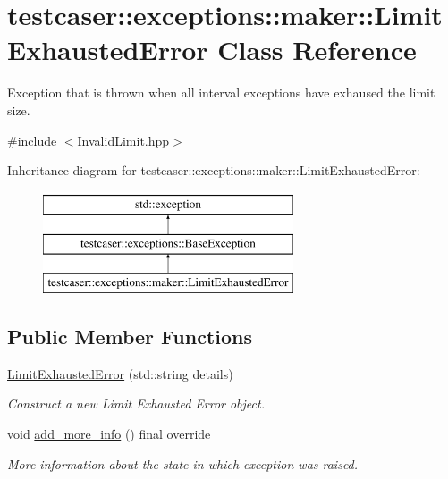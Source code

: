 \hypertarget{classtestcaser_1_1exceptions_1_1maker_1_1LimitExhaustedError}{}\section{testcaser\+:\+:exceptions\+:\+:maker\+:\+:Limit\+Exhausted\+Error Class Reference}
\label{classtestcaser_1_1exceptions_1_1maker_1_1LimitExhaustedError}


Exception that is thrown when all interval exceptions have exhaused the limit size.  




{\ttfamily \#include $<$Invalid\+Limit.\+hpp$>$}

Inheritance diagram for testcaser\+:\+:exceptions\+:\+:maker\+:\+:Limit\+Exhausted\+Error\+:\begin{figure}[H]
\begin{center}
\leavevmode
\includegraphics[height=3.000000cm]{classtestcaser_1_1exceptions_1_1maker_1_1LimitExhaustedError}
\end{center}
\end{figure}
\subsection*{Public Member Functions}
\begin{DoxyCompactItemize}
\item 
\mbox{\hyperlink{classtestcaser_1_1exceptions_1_1maker_1_1LimitExhaustedError_a9ba2ad6f34755e1039132a7fa763e55f}{Limit\+Exhausted\+Error}} (std\+::string details)
\begin{DoxyCompactList}\small\item\em Construct a new Limit Exhausted Error object. \end{DoxyCompactList}\item 
void \mbox{\hyperlink{classtestcaser_1_1exceptions_1_1maker_1_1LimitExhaustedError_a40beeee091c1d5a35a12d6ab974c0895}{add\+\_\+more\+\_\+info}} () final override
\begin{DoxyCompactList}\small\item\em More information about the state in which exception was raised. \end{DoxyCompactList}\end{DoxyCompactItemize}

